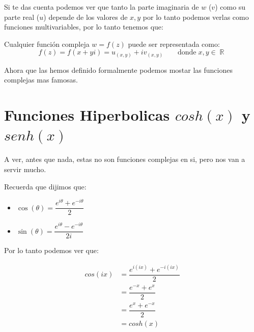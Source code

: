 \documentclass[12pt, fleqn]{report}                             %
\DeclareMathOperator \Space {\quad}                             %
\newcommand{\Wrap}[1]{\left( #1 \right)}                        %
\newenvironment{MultiLineEquation}[1]                           %
        {\begin{equation}\begin{alignedat}{#1}}                     %
        {\end{alignedat}\end{equation}}                             %
\DeclareMathOperator \Reals     {\mathbb{R}}                     %
\newcommand{\Cos}[1]{\cos\Wrap{#1}}                             %
\newcommand{\Sin}[1]{\sin\Wrap{#1}}                             %
\begin{document}
            Si te das cuenta podemos ver que tanto la parte imaginaria de $w$ ($v$) como su parte
            real ($u$) depende de los valores de $x, y$ por lo tanto podemos verlas como funciones
            multivariables, por lo tanto tenemos que:
                

            Cualquier función compleja $w = f(z)$ puede ser representada como:
            \begin{equation}
               f(z) = f(x+yi) = u_{(x, y)} + iv_{(x, y)} \Space\text{ donde}\; x, y \in \Reals 
            \end{equation}


            Ahora que las hemos definido formalmente podemos mostar las funciones complejas
            mas famosas.





        \clearpage
        \section{Funciones Hiperbolicas $cosh(x)$ y $senh(x)$}

            A ver, antes que nada, estas no son funciones complejas en si, pero nos
            van a servir mucho.

            Recuerda que dijimos que:

            \begin{itemize}
                \item $\Cos{\theta} = \dfrac{ e^{i\theta} + e^{-i\theta} }{2}$
                \item $\Sin{\theta} = \dfrac{ e^{i\theta} - e^{-i\theta} }{2i}$
            \end{itemize}

            Por lo tanto podemos ver que:

            \begin{MultiLineEquation}{2}
                cos(ix) &= \dfrac{ e^{i(ix)} + e^{-i(ix)} }{2}  \\
                        &= \dfrac{ e^{-x} + e^x }{2}            \\
                        &= \dfrac{ e^x + e^{-x} }{2}            \\
                        &= cosh(x) 
            \end{MultiLineEquation}
\end{document}
